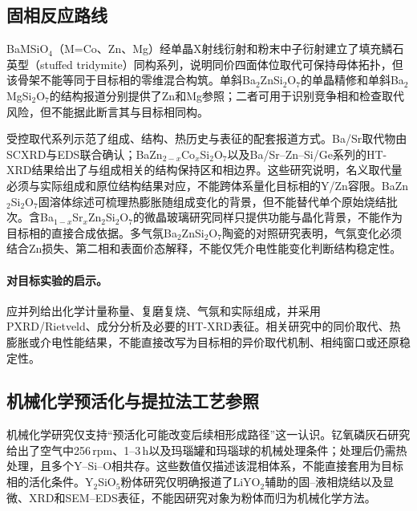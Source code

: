 \subsection{固相反应路线}

BaMSiO$_4$（M=Co、Zn、Mg）经单晶X射线衍射和粉末中子衍射建立了填充鳞石英型（stuffed tridymite）同构系列，说明同价四面体位取代可保持母体拓扑，但该骨架不能等同于目标相的零维混合构筑\cite{liu1993structures}。单斜Ba$_2$ZnSi$_2$O$_7$的单晶精修和单斜Ba$_2$MgSi$_2$O$_7$的结构报道分别提供了Zn和Mg参照；二者可用于识别竞争相和检查取代风险，但不能据此断言其与目标相同构\cite{kaiser2002crystal,aitasalo2006crystal}。

受控取代系列示范了组成、结构、热历史与表征的配套报道方式。Ba\slash Sr取代物由SCXRD与EDS联合确认；BaZn$_{2-x}$Co$_x$Si$_2$O$_7$以及Ba\slash Sr--Zn--Si\slash Ge系列的HT-XRD结果给出了与组成相关的结构保持区和相边界。这些研究说明，名义取代量必须与实际组成和原位结构结果对应，不能跨体系量化目标相的Y\slash Zn容限\cite{thieme2015ba1,kerstan2013bazn2si2o7,thieme2016negative}。BaZn$_2$Si$_2$O$_7$固溶体综述可梳理热膨胀随组成变化的背景，但不能替代单个原始烧结批次\cite{thieme2022solid}。含Ba$_{1-x}$Sr$_x$Zn$_2$Si$_2$O$_7$的微晶玻璃研究同样只提供功能与晶化背景，不能作为目标相的直接合成依据\cite{thieme2017variable}。多气氛Ba$_2$ZnSi$_2$O$_7$陶瓷的对照研究表明，气氛变化必须结合Zn损失、第二相和表面价态解释，不能仅凭介电性能变化判断结构稳定性\cite{zou2019anti}。

\paragraph{对目标实验的启示。}应并列给出化学计量称量、复磨复烧、气氛和实际组成，并采用PXRD\slash Rietveld、成分分析及必要的HT-XRD表征。相关研究中的同价取代、热膨胀或介电性能结果，不能直接改写为目标相的异价取代机制、相纯窗口或还原稳定性。

\subsection{机械化学预活化与提拉法工艺参照}

机械化学研究仅支持“预活化可能改变后续相形成路径”这一认识。钇氧磷灰石研究给出了空气中256\,rpm、1--3\,h以及玛瑙罐和玛瑙球的机械处理条件；处理后仍需热处理，且多个Y--Si--O相共存。这些数值仅描述该混相体系，不能直接套用为目标相的活化条件\cite{tzvetkov2001effects}。Y$_2$SiO$_5$粉体研究仅明确报道了LiYO$_2$辅助的固--液相烧结以及显微、XRD和SEM--EDS表征，不能因研究对象为粉体而归为机械化学方法\cite{yldrm2009y2sio5}。

